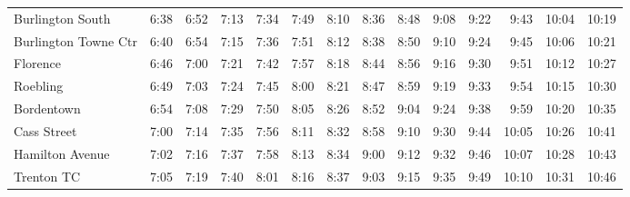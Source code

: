 \begin{center}
\begin{tabular}{@{}lrrrrrrrrrrrrr@{}}
Burlington South & 6:38 & 6:52 & 7:13 & 7:34 & 7:49 & 8:10 & 8:36 & 8:48 & 9:08 & 9:22 & 9:43 & 10:04 & 10:19 \\
Burlington Towne Ctr & 6:40 & 6:54 & 7:15 & 7:36 & 7:51 & 8:12 & 8:38 & 8:50 & 9:10 & 9:24 & 9:45 & 10:06 & 10:21 \\
Florence & 6:46 & 7:00 & 7:21 & 7:42 & 7:57 & 8:18 & 8:44 & 8:56 & 9:16 & 9:30 & 9:51 & 10:12 & 10:27 \\
Roebling & 6:49 & 7:03 & 7:24 & 7:45 & 8:00 & 8:21 & 8:47 & 8:59 & 9:19 & 9:33 & 9:54 & 10:15 & 10:30 \\
Bordentown & 6:54 & 7:08 & 7:29 & 7:50 & 8:05 & 8:26 & 8:52 & 9:04 & 9:24 & 9:38 & 9:59 & 10:20 & 10:35 \\
Cass Street & 7:00 & 7:14 & 7:35 & 7:56 & 8:11 & 8:32 & 8:58 & 9:10 & 9:30 & 9:44 & 10:05 & 10:26 & 10:41 \\
Hamilton Avenue & 7:02 & 7:16 & 7:37 & 7:58 & 8:13 & 8:34 & 9:00 & 9:12 & 9:32 & 9:46 & 10:07 & 10:28 & 10:43 \\
Trenton TC & 7:05 & 7:19 & 7:40 & 8:01 & 8:16 & 8:37 & 9:03 & 9:15 & 9:35 & 9:49 & 10:10 & 10:31 & 10:46 \\
\bottomrule\end{tabular}\end{center}
